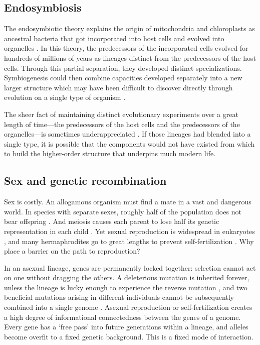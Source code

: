 \documentclass[11pt]{article}
\begin{document}
\subsection*{Endosymbiosis}

The endosymbiotic theory explains the origin of mitochondria and chloroplasts as ancestral bacteria that got incorporated into host cells and evolved into organelles \citep{sagan1967origin,zimorski2014endosymbiotic}. In this theory, the predecessors of the incorporated cells evolved for hundreds of millions of years as lineages distinct from the predecessors of the host cells. Through this partial separation, they developed distinct specializations. Symbiogenesis could then combine capacities developed separately into a new larger structure which may have been difficult to discover directly through evolution on a single type of organism \citep{watson2003computational}.

The sheer fact of maintaining distinct evolutionary experiments over a great length of time---the predecessors of the host cells and the predecessors of the organelles---is sometimes underappreciated \citep{lane2015vital}. If those lineages had blended into a single type, it is possible that the components would not have existed from which to build the higher-order structure that underpins much modern life. 


\subsection*{Sex and genetic recombination}


Sex is costly. An allogamous organism must find a mate in a vast and dangerous world. In species with separate sexes, roughly half of the population does not bear offspring \citep{smith1971origin}. And meiosis causes each parent to lose half its genetic representation in each child \citep{williams1975sex}. Yet sexual reproduction is widespread in eukaryotes \citep{speijer2015sex}, and many hermaphrodites go to great lengths to prevent self-fertilization \citep{charlesworth2005plant}. Why place a barrier on the path to reproduction?

In an asexual lineage, genes are permanently locked together: selection cannot act on one without dragging the others. A deleterious mutation is inherited forever, unless the lineage is lucky enough to experience the reverse mutation \citep{muller1964relation}, and two beneficial mutations arising in different individuals cannot be subsequently combined into a single genome \citep{muller1932some,fisher1930genetical}. Asexual reproduction or self-fertilization creates a high degree of informational connectedness between the genes of a genome. Every gene has a `free pass' into future generations within a lineage, and alleles become overfit to a fixed genetic background. This is a fixed mode of interaction.
\end{document}
